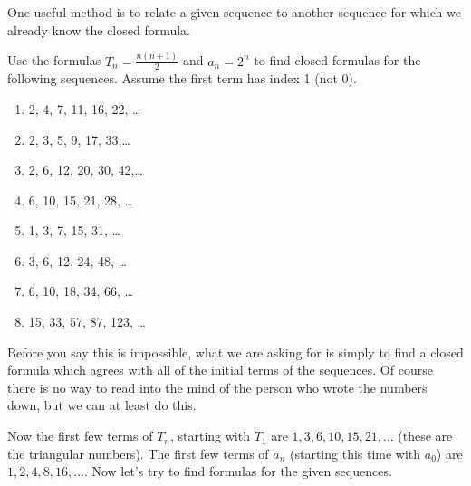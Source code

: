 \documentclass[12pt]{article}
\begin{document}
One useful method is to relate a given sequence to another sequence for which we already know the closed formula.

\begin{example}
  Use the formulas $T_n = \frac{n(n+1)}{2}$ and $a_n = 2^n$ to find closed formulas for the following sequences.  Assume the first term has index 1 (not 0).
  \begin{enumerate}
    \item 2, 4, 7, 11, 16, 22, \ldots
    \item 2, 3, 5, 9, 17, 33,\ldots
    \item 2, 6, 12, 20, 30, 42,\ldots
    \item 6, 10, 15, 21, 28, \ldots
    \item 1, 3, 7, 15, 31, \ldots
    \item 3, 6, 12, 24, 48, \ldots
    \item 6, 10, 18, 34, 66, \ldots
    \item 15, 33, 57, 87, 123, \ldots
  \end{enumerate}

\begin{solution}
  Before you say this is impossible, what we are asking for is simply to find a closed formula which agrees with all of the initial terms of the sequences.  Of course there is no way to read into the mind of the person who wrote the numbers down, but we can at least do this.
  
  Now the first few terms of $T_n$, starting with $T_1$ are $1, 3, 6, 10, 15, 21, \ldots$ (these are the triangular numbers).  The first few terms of $a_n$ (starting this time with $a_0$) are $1, 2, 4, 8, 16, \ldots$.  Now let's try to find formulas for the given sequences.
  

\end{solution}
\end{example}
\end{document}

